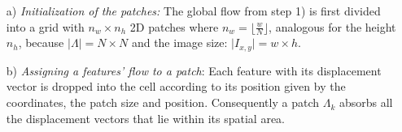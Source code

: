 \begin{enumerate}
\item[a)]\textit{Initialization of the patches:}
The global flow from step 1) is first divided into a grid with $n_w \times n_h$ 2D patches where $n_w = \lfloor \frac{w}{N} \rfloor$, analogous for the height $n_h$, because $\vert \Lambda \vert = N \times N$ and the image size: $\vert I_{x,y} \vert = w \times h$. %
%
\item[b)]\textit{Assigning a features' flow to a patch}:
Each feature with its displacement vector is dropped into the cell according to its position given by the coordinates, the patch size and position. Consequently a patch $\Lambda_{k}$ absorbs all the displacement vectors that lie within its spatial area.\\
%
\end{enumerate}
%
